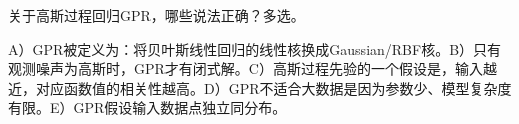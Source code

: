 关于高斯过程回归GPR，哪些说法正确？多选。


A）GPR被定义为：将贝叶斯线性回归的线性核换成Gaussian/RBF核。B）只有观测噪声为高斯时，GPR才有闭式解。C）高斯过程先验的一个假设是，输入越近，对应函数值的相关性越高。D）GPR不适合大数据是因为参数少、模型复杂度有限。E）GPR假设输入数据点独立同分布。
